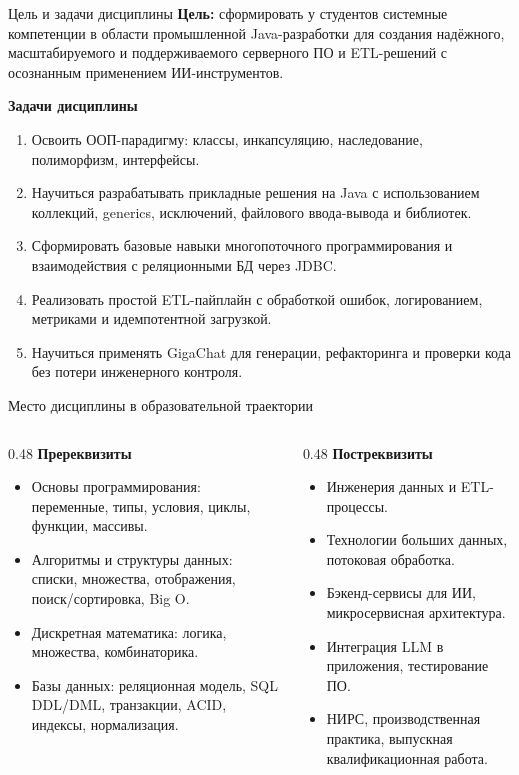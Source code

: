 \documentclass[aspectratio=169,10pt]{beamer}
\newcommand{\smallgap}{\vspace{0.35em}}
\begin{document}
\begin{frame}{Цель и задачи дисциплины}
\small
\textbf{Цель:} сформировать у студентов системные компетенции в области промышленной Java-разработки для создания надёжного, масштабируемого и поддерживаемого серверного ПО и ETL-решений с осознанным применением ИИ-инструментов.

\smallgap
\textbf{Задачи дисциплины}
\begin{enumerate}
  \item Освоить ООП-парадигму: классы, инкапсуляцию, наследование, полиморфизм, интерфейсы.
  \item Научиться разрабатывать прикладные решения на Java с использованием коллекций, generics, исключений, файлового ввода-вывода и библиотек.
  \item Сформировать базовые навыки многопоточного программирования и взаимодействия с реляционными БД через JDBC.
  \item Реализовать простой ETL-пайплайн с обработкой ошибок, логированием, метриками и идемпотентной загрузкой.
  \item Научиться применять GigaChat для генерации, рефакторинга и проверки кода без потери инженерного контроля.
\end{enumerate}
\end{frame}

\begin{frame}{Место дисциплины в образовательной траектории}
\small
\begin{columns}[T,onlytextwidth]
\begin{column}{0.48\textwidth}
\textbf{Пререквизиты}
\begin{itemize}
  \item Основы программирования: переменные, типы, условия, циклы, функции, массивы.
  \item Алгоритмы и структуры данных: списки, множества, отображения, поиск/сортировка, Big O.
  \item Дискретная математика: логика, множества, комбинаторика.
  \item Базы данных: реляционная модель, SQL DDL/DML, транзакции, ACID, индексы, нормализация.
\end{itemize}
\end{column}
\begin{column}{0.48\textwidth}
\textbf{Постреквизиты}
\begin{itemize}
  \item Инженерия данных и ETL-процессы.
  \item Технологии больших данных, потоковая обработка.
  \item Бэкенд-сервисы для ИИ, микросервисная архитектура.
  \item Интеграция LLM в приложения, тестирование ПО.
  \item НИРС, производственная практика, выпускная квалификационная работа.
\end{itemize}
\end{column}
\end{columns}
\end{frame}
\end{document}
